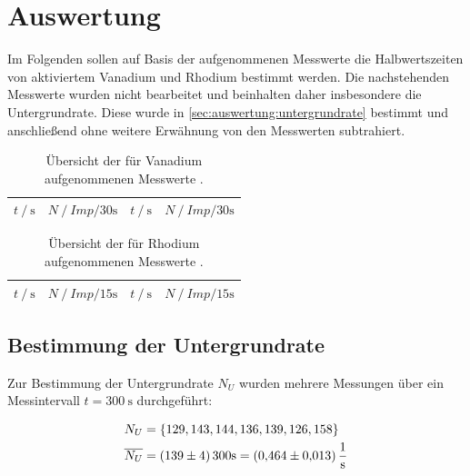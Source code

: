\section{Auswertung} \label{sec:auswertung}

Im Folgenden sollen auf Basis der aufgenommenen Messwerte
die Halbwertszeiten von aktiviertem Vanadium und Rhodium bestimmt werden.
Die nachstehenden Messwerte wurden nicht bearbeitet
und beinhalten daher insbesondere die Untergrundrate.
Diese wurde in \autoref{sec:auswertung:untergrundrate} bestimmt
und anschließend ohne weitere Erwähnung von den Messwerten subtrahiert.

\begin{table}[H]
  \centering
  \caption{Übersicht der für Vanadium aufgenommenen Messwerte \cite{datenundhinweise}.}
  \label{tab:messwerte_vanadium}
  \begin{tabular}{c c | c c}
  \toprule
  $t \mathbin{/} \si{\second}$ &
  $N \mathbin{/} \si{{Imp} \per 30 \second}$ &
  $t \mathbin{/} \si{\second}$ &
  $N \mathbin{/} \si{{Imp} \per 30 \second}$ \\
  \midrule
  
  \bottomrule
  \end{tabular}
\end{table}

\begin{table}[H]
  \centering
  \caption{Übersicht der für Rhodium aufgenommenen Messwerte \cite{datenundhinweise}.}
  \label{tab:messwerte_rhodium}
  \begin{tabular}{c c | c c}
  \toprule
  $t \mathbin{/} \si{\second}$ &
  $N \mathbin{/} \si{{Imp} \per 15 \second}$ &
  $t \mathbin{/} \si{\second}$ &
  $N \mathbin{/} \si{{Imp} \per 15 \second}$ \\
  \midrule
  
  \bottomrule
  \end{tabular}
\end{table}

\subsection{Bestimmung der Untergrundrate}
\label{sec:auswertung:untergrundrate}
Zur Bestimmung der Untergrundrate $N_U$ wurden mehrere Messungen
über ein Messintervall $t = \SI{300}{\second}$ durchgeführt:

\begin{align*}
  N_U &= \{129, 143, 144, 136, 139, 126, 158\} \\
  \overline{N_U} &= \SI{139 \pm 4}{\per{300}\second} = \SI{0.464 \pm 0.013}{\per\second} \\
\end{align*}


